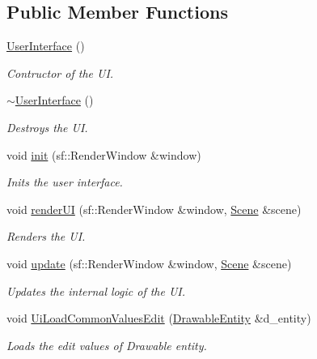 \subsection*{Public Member Functions}
\begin{DoxyCompactItemize}
\item 
\hyperlink{class_user_interface_ae6fb70370701b3bd6120e923df9705b0}{User\+Interface} ()
\begin{DoxyCompactList}\small\item\em Contructor of the UI. \end{DoxyCompactList}\item 
\hyperlink{class_user_interface_ae588b2ff1711a016dd4c6fc5002c0841}{$\sim$\+User\+Interface} ()
\begin{DoxyCompactList}\small\item\em Destroys the UI. \end{DoxyCompactList}\item 
void \hyperlink{class_user_interface_a464f85830f41de3b226a722bb436b22d}{init} (sf\+::\+Render\+Window \&window)
\begin{DoxyCompactList}\small\item\em Inits the user interface. \end{DoxyCompactList}\item 
void \hyperlink{class_user_interface_abdff7c45be86654013ba3b90f58205ec}{render\+UI} (sf\+::\+Render\+Window \&window, \hyperlink{class_scene}{Scene} \&scene)
\begin{DoxyCompactList}\small\item\em Renders the UI. \end{DoxyCompactList}\item 
void \hyperlink{class_user_interface_aff195015c5cdd156066745882bd3fa2b}{update} (sf\+::\+Render\+Window \&window, \hyperlink{class_scene}{Scene} \&scene)
\begin{DoxyCompactList}\small\item\em Updates the internal logic of the UI. \end{DoxyCompactList}\item 
void \hyperlink{class_user_interface_abd2782013953f24723f787302f32e134}{Ui\+Load\+Common\+Values\+Edit} (\hyperlink{class_drawable_entity}{Drawable\+Entity} \&d\+\_\+entity)
\begin{DoxyCompactList}\small\item\em Loads the edit values of Drawable entity. \end{DoxyCompactList}\item 

\end{DoxyCompactItemize}
